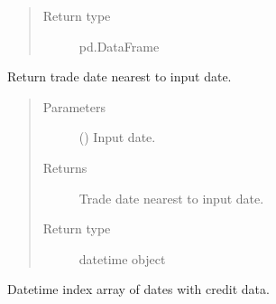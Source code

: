 \documentclass[letterpaper,10pt,english]{report}
\begin{document}
\begin{fulllineitems}
\begin{fulllineitems}
\begin{quote}
\begin{description}
\item[{Return type}] \leavevmode
pd.DataFrame

\end{description}\end{quote}

\end{fulllineitems}


\begin{fulllineitems}
\label{\detokenize{index:lgimapy.index.IndexBuilder.nearest_date}}
Return trade date nearest to input date.
\begin{quote}\begin{description}
\item[{Parameters}] \leavevmode
{} () \textendash{} Input date.

\item[{Returns}] \leavevmode
{} \textendash{} Trade date nearest to input date.

\item[{Return type}] \leavevmode
datetime object

\end{description}\end{quote}

\end{fulllineitems}


\begin{fulllineitems}
Datetime index array of dates with credit data.

\end{fulllineitems}


\end{fulllineitems}

\end{document}
